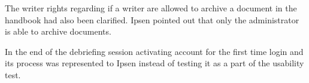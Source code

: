 The writer rights regarding if a writer are allowed to archive a document in the handbook had also been clarified.
Ipsen pointed out that only the administrator is able to archive documents.

In the end of the debriefing session activating account for the first time login and its process was represented to Ipsen instead of testing it as a part of the usability test.








